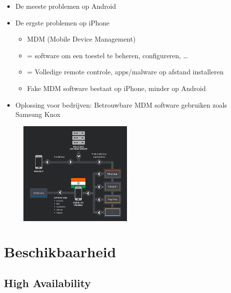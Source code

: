 \documentclass{article}
\begin{document}
\begin{itemize}
    \item De meeste problemen op Android
    \item De ergste problemen op iPhone
    \begin{itemize}
        \item MDM (Mobile Device Management)
        \item = software om een toestel te beheren, configureren, \dots
        \item = Volledige remote controle, apps/malware op afstand installeren
        \item Fake MDM software bestaat op iPhone, minder op Android
    \end{itemize}
    \item Oplossing voor bedrijven: Betrouwbare MDM software gebruiken zoals Samsung Knox
\end{itemize}

\begin{figure}[H]
    \centering
    \includegraphics[width=0.5\textwidth]{malware-iphone.png}
    \caption{}
\end{figure}

\section{Beschikbaarheid}

\subsection{High Availability}
\end{document}
